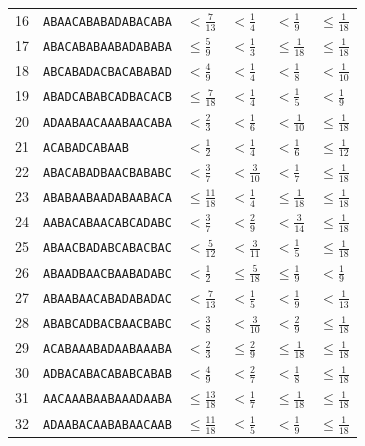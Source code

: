 \documentclass[11pt]{article}
\begin{document}
\begin{longtable}{rlllll}
16 & \texttt{ABAACABABADABACABA} & $< \frac{7}{13}$ & $< \frac{1}{4}$ & $< \frac{1}{9}$ & $\leq \frac{1}{18}$ \\
17 & \texttt{ABACABABAABADABABA} & $\leq \frac{5}{9}$ & $< \frac{1}{3}$ & $\leq \frac{1}{18}$ & $\leq \frac{1}{18}$ \\
18 & \texttt{ABCABADACBACABABAD} & $< \frac{4}{9}$ & $< \frac{1}{4}$ & $< \frac{1}{8}$ & $< \frac{1}{10}$ \\
19 & \texttt{ABADCABABCADBACACB} & $\leq \frac{7}{18}$ & $< \frac{1}{4}$ & $< \frac{1}{5}$ & $< \frac{1}{9}$ \\
20 & \texttt{ADAABAACAAABAACABA} & $< \frac{2}{3}$ & $< \frac{1}{6}$ & $< \frac{1}{10}$ & $\leq \frac{1}{18}$ \\
21 & \texttt{ACABADCABAAB} & $< \frac{1}{2}$ & $< \frac{1}{4}$ & $< \frac{1}{6}$ & $\leq \frac{1}{12}$ \\
22 & \texttt{ABACABADBAACBABABC} & $< \frac{3}{7}$ & $< \frac{3}{10}$ & $< \frac{1}{7}$ & $\leq \frac{1}{18}$ \\
23 & \texttt{ABABAABAADABAABACA} & $\leq \frac{11}{18}$ & $< \frac{1}{4}$ & $\leq \frac{1}{18}$ & $\leq \frac{1}{18}$ \\
24 & \texttt{AABACABAACABCADABC} & $< \frac{3}{7}$ & $< \frac{2}{9}$ & $< \frac{3}{14}$ & $\leq \frac{1}{18}$ \\
25 & \texttt{ABAACBADABCABACBAC} & $< \frac{5}{12}$ & $< \frac{3}{11}$ & $< \frac{1}{5}$ & $\leq \frac{1}{18}$ \\
26 & \texttt{ABAADBAACBAABADABC} & $< \frac{1}{2}$ & $\leq \frac{5}{18}$ & $\leq \frac{1}{9}$ & $< \frac{1}{9}$ \\
27 & \texttt{ABAABAACABADABADAC} & $< \frac{7}{13}$ & $< \frac{1}{5}$ & $< \frac{1}{9}$ & $< \frac{1}{13}$ \\
28 & \texttt{ABABCADBACBAACBABC} & $< \frac{3}{8}$ & $< \frac{3}{10}$ & $< \frac{2}{9}$ & $\leq \frac{1}{18}$ \\
29 & \texttt{ACABAAABADAABAAABA} & $< \frac{2}{3}$ & $\leq \frac{2}{9}$ & $\leq \frac{1}{18}$ & $\leq \frac{1}{18}$ \\
30 & \texttt{ADBACABACABABCABAB} & $< \frac{4}{9}$ & $< \frac{2}{7}$ & $< \frac{1}{8}$ & $\leq \frac{1}{18}$ \\
31 & \texttt{AACAAABAABAAADAABA} & $\leq \frac{13}{18}$ & $< \frac{1}{7}$ & $\leq \frac{1}{18}$ & $\leq \frac{1}{18}$ \\
32 & \texttt{ADAABACAABABAACAAB} & $\leq \frac{11}{18}$ & $< \frac{1}{5}$ & $< \frac{1}{9}$ & $\leq \frac{1}{18}$ \\

\end{longtable}
\end{document}
